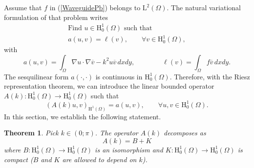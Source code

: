 \documentclass[11pt,a4paper]{report}
\newcommand{\Om}{\Omega}
\newcommand{\mrm}[1]{\mathrm{#1}}
\newcommand{\mL}{\mrm{L}}
\newcommand{\mH}{\mrm{H}}
\newtheorem{theorem}{Theorem}[chapter]
\begin{document}
Assume that $f$ in (\ref{WaveguidePb}) belongs to $\mL^2(\Om)$.  The natural variational formulation of that problem writes
\begin{equation}\label{PbVariaLow}
\begin{array}{|l}
\mbox{Find }u\in\mrm{H}^1_0(\Om) \mbox{ such that }\\[3pt]
a(u,v)=\ell(v),\qquad \forall v\in\mH^1_0(\Om),
\end{array}
\end{equation}
with 
\[
a(u,v)=\int_{\Om}\nabla u\cdot\nabla \overline{v}-k^2 u\overline{v}\,dxdy,\qquad\qquad \ell(v)=\int_{\Om}f\overline{v}\,dxdy.
\]
The sesquilinear form $a(\cdot,\cdot)$ is continuous in $\mH^1_0(\Om)$. Therefore, with the Riesz representation theorem, we can introduce the linear bounded operator $A(k):\mH^1_0(\Om)\to\mH^1_0(\Om)$ such that
\begin{equation}\label{DefOpAk}
(A(k)u,v)_{\mH^1(\Om)} =a(u,v),\qquad\forall u,v\in \mH^1_0(\Om).
\end{equation}
In this section, we establish the following statement.
\begin{theorem}\label{ThmDLowFreq}
Pick $k\in(0;\pi)$. The operator $A(k)$ decomposes as 
\[
A(k)=B+K
\]
where $B:\mH^1_0(\Om)\to\mH^1_0(\Om)$ is an isomorphism and $K:\mH^1_0(\Om)\to\mH^1_0(\Om)$ is compact ($B$ and $K$ are allowed to depend on $k$).
\end{theorem}
\end{document}
